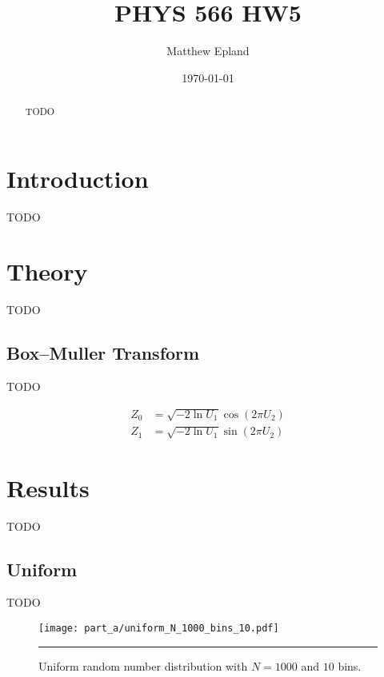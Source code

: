 \documentclass[notitlepage,aps,prd,nofootinbib]{revtex4-1}
\begin{document}
\title{PHYS 566 HW5}
\author{Matthew Epland}

\date{\today}

\begin{abstract}
TODO
\end{abstract}\maketitle

\section{Introduction}
\label{sec:intro}
TODO

\section{Theory}
\label{sec:theory}
TODO

\subsection{Box--Muller Transform}
\label{subsec:box_muller}
TODO

\begin{align}
Z_{0} &= \sqrt{-2\ln U_{1}} \cos\left(2\pi U_{2}\right) \label{eq:z0} \\
Z_{1} &= \sqrt{-2\ln U_{1}} \sin\left(2\pi U_{2}\right) \label{eq:z1}
\end{align}

\clearpage
\section{Results}
\label{sec:results}
TODO

\subsection{Uniform}
\label{subsec:uniform_results}
TODO


\begin{figure}[!htbc]
  \centering
  \texttt{[image: part\_a/uniform\_N\_1000\_bins\_10.pdf]}
	{\par\nobreak\rule[9pt]{35em}{0.5pt}\vspace{-5mm}}
	\caption{Uniform random number distribution with $N = 1000$ and $10$ bins.}
	\label{fig:uniform_N_1000_bins_10}
\end{figure}
\end{document}
